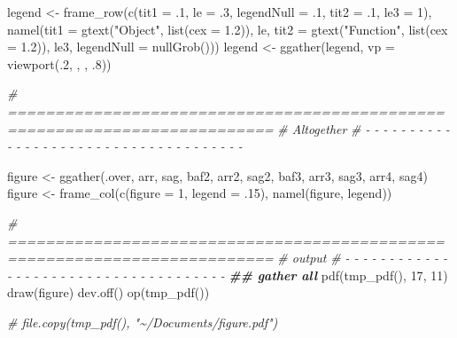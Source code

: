 \documentclass[
]{article}
\newenvironment{Shaded}{\begin{snugshade}}{\end{snugshade}}
\newcommand{\AttributeTok}[1]{\textcolor[rgb]{0.77,0.63,0.00}{#1}}
\newcommand{\CommentTok}[1]{\textcolor[rgb]{0.56,0.35,0.01}{\textit{#1}}}
\newcommand{\DecValTok}[1]{\textcolor[rgb]{0.00,0.00,0.81}{#1}}
\newcommand{\DocumentationTok}[1]{\textcolor[rgb]{0.56,0.35,0.01}{\textbf{\textit{#1}}}}
\newcommand{\FloatTok}[1]{\textcolor[rgb]{0.00,0.00,0.81}{#1}}
\newcommand{\FunctionTok}[1]{\textcolor[rgb]{0.00,0.00,0.00}{#1}}
\newcommand{\NormalTok}[1]{#1}
\newcommand{\OtherTok}[1]{\textcolor[rgb]{0.56,0.35,0.01}{#1}}
\newcommand{\StringTok}[1]{\textcolor[rgb]{0.31,0.60,0.02}{#1}}
\begin{document}
\begin{Shaded}
\begin{Highlighting}[]
\NormalTok{legend }\OtherTok{\textless{}{-}} \FunctionTok{frame\_row}\NormalTok{(}\FunctionTok{c}\NormalTok{(}\AttributeTok{tit1 =}\NormalTok{ .}\DecValTok{1}\NormalTok{, }\AttributeTok{le =}\NormalTok{ .}\DecValTok{3}\NormalTok{, }\AttributeTok{legendNull =}\NormalTok{ .}\DecValTok{1}\NormalTok{,}
                      \AttributeTok{tit2 =}\NormalTok{ .}\DecValTok{1}\NormalTok{, }\AttributeTok{le3 =} \DecValTok{1}\NormalTok{),}
                    \FunctionTok{namel}\NormalTok{(}\AttributeTok{tit1 =} \FunctionTok{gtext}\NormalTok{(}\StringTok{"Object"}\NormalTok{, }\FunctionTok{list}\NormalTok{(}\AttributeTok{cex =} \FloatTok{1.2}\NormalTok{)), le,}
                          \AttributeTok{tit2 =} \FunctionTok{gtext}\NormalTok{(}\StringTok{"Function"}\NormalTok{, }\FunctionTok{list}\NormalTok{(}\AttributeTok{cex =} \FloatTok{1.2}\NormalTok{)), le3,}
                          \AttributeTok{legendNull =} \FunctionTok{nullGrob}\NormalTok{()))}
\NormalTok{legend }\OtherTok{\textless{}{-}} \FunctionTok{ggather}\NormalTok{(legend, }\AttributeTok{vp =} \FunctionTok{viewport}\NormalTok{(.}\DecValTok{2}\NormalTok{, , , .}\DecValTok{8}\NormalTok{))}
\end{Highlighting}
\end{Shaded}

\begin{Shaded}
\begin{Highlighting}[]
\CommentTok{\# ==========================================================================}
\CommentTok{\# Altogether}
\CommentTok{\# {-} {-} {-} {-} {-} {-} {-} {-} {-} {-} {-} {-} {-} {-} {-} {-} {-} {-} {-} {-} {-} {-} {-} {-} {-} {-} {-} {-} {-} {-} {-} {-} {-} {-} {-} {-} {-}}

\NormalTok{figure }\OtherTok{\textless{}{-}} \FunctionTok{ggather}\NormalTok{(.over, arr, sag, baf2, arr2, sag2,}
\NormalTok{                  baf3, arr3, sag3, arr4, sag4)}
\NormalTok{figure }\OtherTok{\textless{}{-}} \FunctionTok{frame\_col}\NormalTok{(}\FunctionTok{c}\NormalTok{(}\AttributeTok{figure =} \DecValTok{1}\NormalTok{, }\AttributeTok{legend =}\NormalTok{ .}\DecValTok{15}\NormalTok{),}
                    \FunctionTok{namel}\NormalTok{(figure, legend))}
\end{Highlighting}
\end{Shaded}

\begin{Shaded}
\begin{Highlighting}[]
\CommentTok{\# ==========================================================================}
\CommentTok{\# output}
\CommentTok{\# {-} {-} {-} {-} {-} {-} {-} {-} {-} {-} {-} {-} {-} {-} {-} {-} {-} {-} {-} {-} {-} {-} {-} {-} {-} {-} {-} {-} {-} {-} {-} {-} {-} {-} {-} {-} {-}}
\DocumentationTok{\#\# gather all}
\FunctionTok{pdf}\NormalTok{(}\FunctionTok{tmp\_pdf}\NormalTok{(), }\DecValTok{17}\NormalTok{, }\DecValTok{11}\NormalTok{)}
\FunctionTok{draw}\NormalTok{(figure)}
\FunctionTok{dev.off}\NormalTok{()}
\FunctionTok{op}\NormalTok{(}\FunctionTok{tmp\_pdf}\NormalTok{())}

\CommentTok{\# file.copy(tmp\_pdf(), "\textasciitilde{}/Documents/figure.pdf")}
\end{Highlighting}
\end{Shaded}
\end{document}
